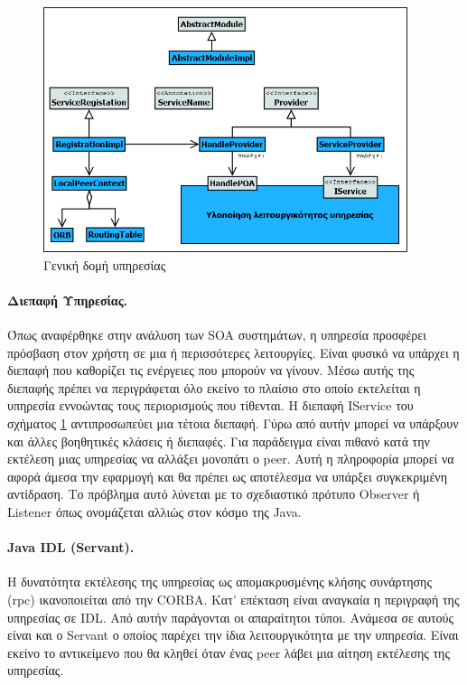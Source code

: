 \begin{figure}[htbp]
  \begin{center}
    \includegraphics[width=0.95\textwidth]{Figures/Architecture/General_service_structure.png}
  \end{center}
  \caption{Γενική δομή υπηρεσίας}
  \label{fig:ServiceStructure}
\end{figure}

\paragraph{Διεπαφή Υπηρεσίας.} Όπως αναφέρθηκε στην ανάλυση των 
SOA συστημάτων, η υπηρεσία προσφέρει πρόσβαση στον χρήστη σε μια ή 
περισσότερες λειτουργίες. Είναι φυσικό να υπάρχει η διεπαφή που καθορίζει 
τις ενέργειες που μπορούν να γίνουν. Μέσω αυτής της διεπαφής πρέπει να 
περιγράφεται όλο εκείνο το πλαίσιο στο οποίο εκτελείται η υπηρεσία 
εννοώντας τους περιορισμούς που τίθενται. Η διεπαφή IService του σχήματος 
\ref{fig:ServiceStructure} αντιπροσωπεύει μια τέτοια διεπαφή. Γύρω από αυτήν 
μπορεί να υπάρξουν και άλλες βοηθητικές κλάσεις ή διεπαφές. Για παράδειγμα 
είναι πιθανό κατά την εκτέλεση μιας υπηρεσίας να αλλάξει μονοπάτι ο peer. 
Αυτή η πληροφορία μπορεί να αφορά άμεσα την εφαρμογή και θα πρέπει ως 
αποτέλεσμα να υπάρξει συγκεκριμένη αντίδραση. Το πρόβλημα αυτό λύνεται 
με το σχεδιαστικό πρότυπο Observer \citep{GoF} ή Listener όπως ονομάζεται 
αλλιώς στον κόσμο της Java.

\paragraph{Java IDL (Servant).} Η δυνατότητα εκτέλεσης της υπηρεσίας ως 
απομακρυσμένης κλήσης συνάρτησης (rpc) ικανοποιείται από την CORBA. Κατ' 
επέκταση είναι αναγκαία η περιγραφή της υπηρεσίας σε IDL. Από αυτήν 
παράγονται οι απαραίτητοι τύποι. Ανάμεσα σε αυτούς είναι και ο Servant 
ο οποίος παρέχει την ίδια λειτουργικότητα με την 
υπηρεσία. Είναι εκείνο το αντικείμενο που θα κληθεί όταν ένας peer λάβει 
μια αίτηση εκτέλεσης της υπηρεσίας.

